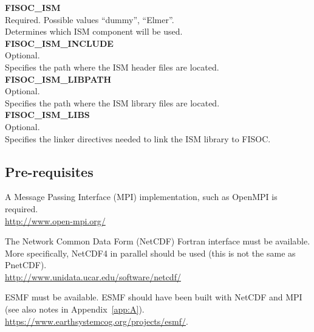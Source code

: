 \documentclass[12pt]{article}
\begin{document}
\begin{flushleft}
\textbf{FISOC\_ISM}                                \\
Required. Possible values ``dummy'', ``Elmer''.    \\
Determines which ISM component will be used.       \\
\vspace{6pt}
\textbf{FISOC\_ISM\_INCLUDE}                       \\ 
Optional.                                          \\
Specifies the path where the ISM header files are located.\\
\vspace{6pt}
\textbf{FISOC\_ISM\_LIBPATH}                       \\
Optional.                                          \\
Specifies the path where the ISM library files are located.\\
\vspace{6pt}
\textbf{FISOC\_ISM\_LIBS}                          \\
Optional.                                          \\
Specifies the linker directives needed to link the ISM library to FISOC. \\
\end{flushleft}



\subsection{Pre-requisites}
\label{sec:PreReq}

A Message Passing Interface (MPI) implementation, such as 
OpenMPI is required.\\
 \url{http://www.open-mpi.org/}

The Network Common Data Form (NetCDF) Fortran interface must be available. 
More specifically, NetCDF4 in parallel should be used (this is not the same as PnetCDF). \\
\url{http://www.unidata.ucar.edu/software/netcdf/}

ESMF must be available. ESMF should have been built with NetCDF and MPI 
(see also notes in Appendix~\ref{app:A}). \\
\url{https://www.earthsystemcog.org/projects/esmf/}.

\end{document}
